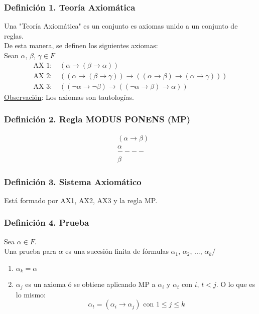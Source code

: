 \documentclass{article}
\newcommand{\comma}{,\,}                                %
\newcommand{\tq}{/\,}                                   %
\begin{document}
\subsubsection*{Definición 1. Teoría Axiomática}
Una "Teoría Axiomática" es un conjunto es axiomas unido a un conjunto de reglas.
\\De esta manera, se definen los siguientes axiomas:
\\Sean $\alpha \comma \beta \comma \gamma \in F$
\begin{align*}
    \text{AX 1: }&  (\alpha \rightarrow (\beta \rightarrow \alpha)) \\
    \text{AX 2: }& ((\alpha \rightarrow (\beta \rightarrow \gamma)) \rightarrow ((\alpha \rightarrow \beta) \rightarrow (\alpha \rightarrow \gamma))) \\
    \text{AX 3: }& ((\neg \alpha \rightarrow \neg \beta) \rightarrow ((\neg \alpha \rightarrow \beta) \rightarrow \alpha))
\end{align*}
\underline{Observación}: Los axiomas son tautologías.

\subsubsection*{Definición 2. Regla MODUS PONENS (MP)}
\begin{align*}
    &(\alpha \rightarrow \beta) \\
    &\alpha \\
    &---- \\
    &\beta
\end{align*}

\subsubsection*{Definición 3. Sistema Axiomático}
Está formado por AX1, AX2, AX3 y la regla MP.

\subsubsection*{Definición 4. Prueba}
Sea $\alpha \in F$.
\\Una prueba para $\alpha$ es una sucesión finita de fórmulas $\alpha_1 \comma \alpha_2 \comma ... \comma \alpha_k \tq$
\begin{enumerate}
    \item $\alpha_k = \alpha$
    \item $\alpha_j$ es un axioma ó se obtiene aplicando MP a $\alpha_i$ y $\alpha_t$ con $i \comma t < j$. O lo que es lo mismo:
    \begin{equation*}
        \alpha_t = (\alpha_i \rightarrow \alpha_j) \text{ con } 1 \leq j \leq k
    \end{equation*}
\end{enumerate}
\end{document}
